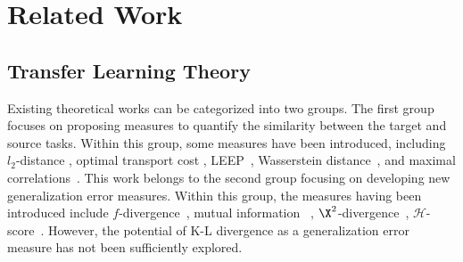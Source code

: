 \section{Related Work}
\subsection{Transfer Learning Theory}
Existing theoretical works can be categorized into two groups. The first group focuses on proposing measures to quantify the similarity between the target and source tasks. Within this group, some measures have been introduced, including $l_2$-distance  \cite{long2014transfer}, optimal transport cost  \cite{courty2016optimal}, 
LEEP~\cite{nguyen2020leep}, Wasserstein distance~\cite{shui2021aggregating_WADN}, and maximal correlations~\cite{lee2019learning_MCW}. 
This work belongs to the second group focusing on developing new generalization error measures. Within this group, the measures 
having been introduced include $f$-divergence~\cite{harremoes2011pairs},  mutual information 
~\cite{bu2020tightening}, $\X^2$-divergence~\cite{tong2021mathematical}, $\mathcal{H}$-score~\cite{bao2019information,wu2024h_Hensemble}. 
However, the potential of K-L divergence as a generalization error measure has not been sufficiently explored. 



